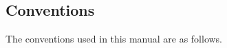 \newcommand{\toolbox}[2]{%
\toolboxtwo{#1}{#2}%
}
\newcommand{\tab}[1]{%
\raisebox{-6pt}{%
\shadowbox{\guilabel{#1}}
}}
\newcommand{\checkbox}[1]{%
\raisebox{2pt}{%
\fbox{%
\raisebox{-4pt}{%
\shadowbox{x}} %
\guilabel{#1}}%
}}
\newcommand{\radiobuttonoff}[1]{%
\raisebox{-4pt}{%
\setlength{\fboxsep}{1pt}%
\shadowbox{%
$\bigcirc$%
}} %
\guilabel{#1}%
}
\newcommand{\radiobuttonon}[1]{%
$\odot$ %
\guilabel{#1}%
}
\newcommand{\selectnumber}[2]{%
\fbox{%
{#1} \fbox{{#2} %
\raisebox{-6pt}{%
\setlength{\fboxsep}{1pt}%
\shadowbox{%
${\blacktriangle}\atop{\blacktriangledown}$%
}}}}}
%
\newcommand{\selectstring}[2]{%
\fbox{%
\guilabel{#1} \fbox{\guilabel{#2} %
\raisebox{-2pt}{%
\setlength{\fboxsep}{1pt}%
\shadowbox{%
$\blacktriangledown$%
}}}}}
%
\newcommand{\browsebutton}{%
\raisebox{-6pt}{%
\shadowbox{\rule[-1mm]{0mm}{4mm}{$\ldots$}}
}}
%
\newcommand{\selectcolor}[2]{%
\fbox{\guilabel{#1} %
\raisebox{-6pt}{%
\setlength{\fboxsep}{0pt}%
\shadowbox{\setlength{\fboxsep}{2pt}%
\fcolorbox{#2}{#2}{\rule{0mm}{5mm}\rule{35mm}{0mm}%
}}}}}
%
\newcommand{\slider}[3]{%
\fbox{%
\guilabel{#1} \guilabel{#2}\% %
\raisebox{-2pt}{%
\setlength{\fboxsep}{1pt}%
\shadowbox{%
$\triangledown$%
}}%
\negthinspace\rule[1mm]{20mm}{1mm}
}}
%
\newcommand{\inputtext}[2]{%
\fbox{%
\guilabel{#1} %
\raisebox{-6pt}{%
\shadowbox{\usertext{#2}}%
}}}
%
%
\subsection{Conventions}\label{label_conventions}

The conventions used in this manual are as follows. 

